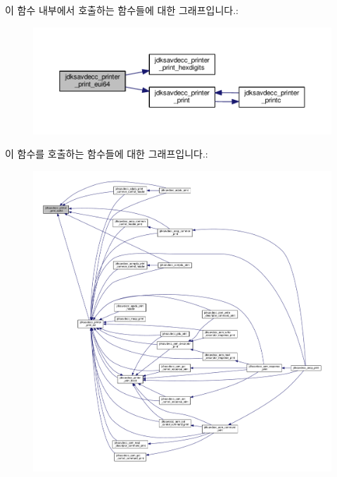 이 함수 내부에서 호출하는 함수들에 대한 그래프입니다.\+:
\nopagebreak
\begin{figure}[H]
\begin{center}
\leavevmode
\includegraphics[width=350pt]{group__util_gafdf65e002e889f4fc89db5d1e532eaa3_cgraph}
\end{center}
\end{figure}




이 함수를 호출하는 함수들에 대한 그래프입니다.\+:
\nopagebreak
\begin{figure}[H]
\begin{center}
\leavevmode
\includegraphics[width=350pt]{group__util_gafdf65e002e889f4fc89db5d1e532eaa3_icgraph}
\end{center}
\end{figure}


